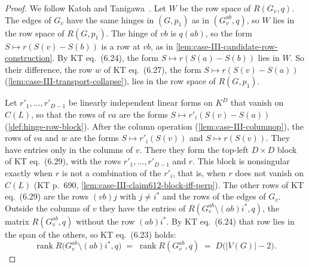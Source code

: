 \begin{proof}
  \leanok
  We follow Katoh and Tanigawa~\cite[pp.~685--686]{katohTanigawa2011}.
  Let $W$ be the row space of $R(G_v, q)$. The edges of $G_v$ have the
  same hinges in $(G, p_1)$ as in $(G_v^{ab}, q)$, so $W$ lies in the row
  space of $R(G, p_1)$. The hinge of $vb$ is $q(ab)$, so the form
  $S \mapsto r(S(v) - S(b))$ is a row at $vb$, as in
  \cref{lem:case-III-candidate-row-construction}. By KT eq.~(6.24), the
  form $S \mapsto r(S(a) - S(b))$ lies in $W$. So their difference, the
  row $w$ of KT eq.~(6.27), the form $S \mapsto r(S(v) - S(a))$
  (\cref{lem:case-III-transport-collapse}), lies in the row space of
  $R(G, p_1)$.

  Let $r'_1, \dots, r'_{D-1}$ be linearly independent linear forms on
  $K^D$ that vanish on $C(L)$, so that the rows of $va$ are the forms
  $S \mapsto r'_i(S(v) - S(a))$ (\cref{def:hinge-row-block}). After the
  column operation (\cref{lem:case-III-columnop}), the rows of $va$ and
  $w$ are the forms $S \mapsto r'_i(S(v))$ and $S \mapsto r(S(v))$. They
  have entries only in the columns of $v$. There they form the top-left
  $D \times D$ block of KT eq.~(6.29), with the rows $r'_1, \dots,
  r'_{D-1}$ and $r$. This block is nonsingular exactly when $r$ is not a
  combination of the $r'_i$, that is, when $r$ does not vanish on $C(L)$
  (KT p.~690, \cref{lem:case-III-claim612-block-iff-perp}). The other
  rows of KT eq.~(6.29) are the rows $(vb)j$ with
  $j \neq i^*$ and the rows of the edges of $G_v$. Outside the columns of
  $v$ they have the entries of $R(G_v^{ab} \setminus (ab)i^*, q)$, the
  matrix $R(G_v^{ab}, q)$ without the row $(ab)i^*$. By KT eq.~(6.24)
  that row lies in the span of the others, so KT eq.~(6.23) holds:
  \[
    \operatorname{rank} R\bigl(G_v^{ab} \setminus (ab)i^*, q\bigr)
    \;=\; \operatorname{rank} R(G_v^{ab}, q) \;=\; D\bigl(|V(G)| - 2\bigr).
  \]


\end{proof}
